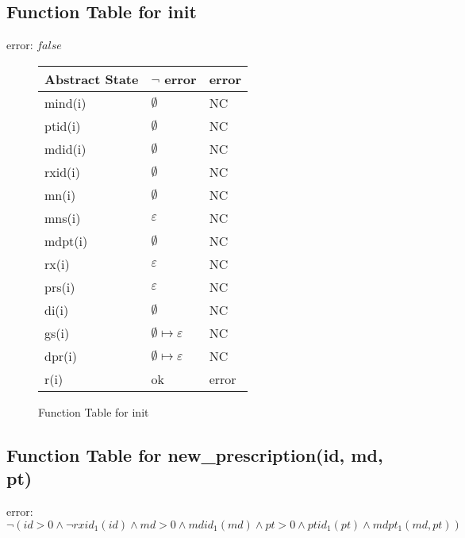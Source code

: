 \subsection{Function Table for init}

error: $false$

\begin{figure}[h]
\begin{center}

\begin{tabular}{|l|l|l|}
\hline
Abstract State & $\neg$ error & error \\ \hline
mind(i)        &   $\emptyset$      & NC    \\ \hline
ptid(i)        &       $\emptyset$    & NC    \\ \hline
mdid(i)        &    $\emptyset$       & NC    \\ \hline
rxid(i)        &      $\emptyset$     & NC    \\ \hline
mn(i)          &       $\emptyset$    & NC    \\ \hline
mns(i)         &   $ \varepsilon$       & NC    \\ \hline
mdpt(i)        &      $\emptyset$     & NC    \\ \hline
rx(i)          &    $ \varepsilon  $    & NC    \\ \hline
prs(i)         &   $ \varepsilon $      & NC    \\ \hline
di(i)          &     $\emptyset$      & NC    \\ \hline
gs(i)          &      $\emptyset \mapsto \varepsilon$     & NC    \\ \hline
dpr(i)         &       $\emptyset \mapsto \varepsilon $    & NC    \\ \hline
r(i)           & ok        & error \\ \hline
\end{tabular}

\caption{Function Table for init}
\label{ft-init}
\end{center}
\end{figure}

\newpage

\subsection{Function Table for new\_prescription(id, md, pt)}

error: $\neg (id > 0 \wedge \neg rxid_{1}(id) \wedge md > 0  \wedge mdid_{1}(md) \wedge pt > 0 \wedge ptid_{1}(pt) \wedge mdpt_{1}(md, pt))$

